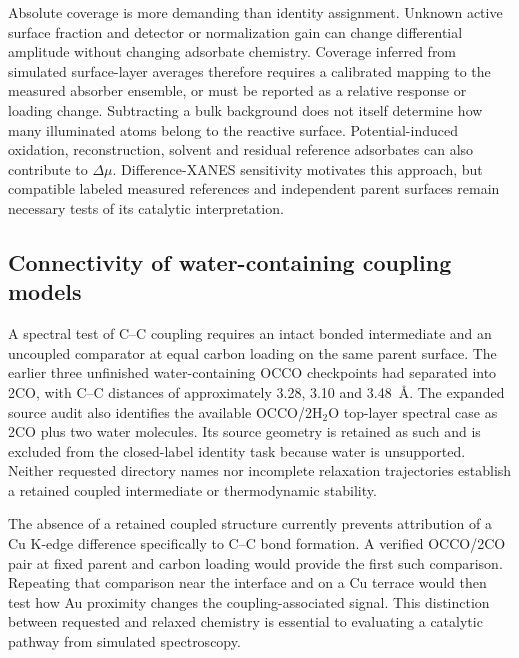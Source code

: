 \documentclass[11pt,a4paper]{article}
\begin{document}
Absolute coverage is more demanding than identity assignment. Unknown active surface fraction and detector or normalization gain can change differential amplitude without changing adsorbate chemistry. Coverage inferred from simulated surface-layer averages therefore requires a calibrated mapping to the measured absorber ensemble, or must be reported as a relative response or loading change. Subtracting a bulk background does not itself determine how many illuminated atoms belong to the reactive surface. Potential-induced oxidation, reconstruction, solvent and residual reference adsorbates can also contribute to $\Delta\mu$. Difference-XANES sensitivity motivates this approach,\cite{ramaker2010,ramaker2014} but compatible labeled measured references and independent parent surfaces remain necessary tests of its catalytic interpretation.

\subsection{Connectivity of water-containing coupling models}
A spectral test of C--C coupling requires an intact bonded intermediate and an uncoupled comparator at equal carbon loading on the same parent surface. The earlier three unfinished water-containing OCCO checkpoints had separated into 2CO, with C--C distances of approximately 3.28, 3.10 and 3.48~\AA. The expanded source audit also identifies the available OCCO/2H$_2$O top-layer spectral case as 2CO plus two water molecules. Its source geometry is retained as such and is excluded from the closed-label identity task because water is unsupported. Neither requested directory names nor incomplete relaxation trajectories establish a retained coupled intermediate or thermodynamic stability.

The absence of a retained coupled structure currently prevents attribution of a Cu K-edge difference specifically to C--C bond formation. A verified OCCO/2CO pair at fixed parent and carbon loading would provide the first such comparison. Repeating that comparison near the interface and on a Cu terrace would then test how Au proximity changes the coupling-associated signal. This distinction between requested and relaxed chemistry is essential to evaluating a catalytic pathway from simulated spectroscopy.
\end{document}
